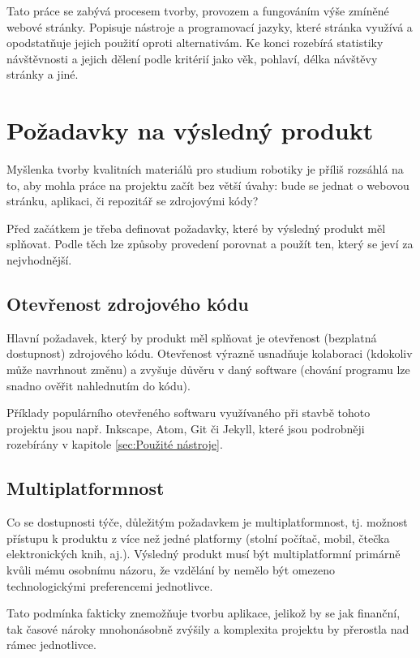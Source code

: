 \documentclass[a4paper, 12pt]{article}
\begin{document}
  Tato práce se zabývá procesem tvorby, provozem a fungováním výše zmíněné webové stránky. Popisuje nástroje a programovací jazyky, které stránka využívá a opodstatňuje jejich použití oproti alternativám. Ke konci rozebírá statistiky návštěvnosti a jejich dělení podle kritérií jako věk, pohlaví, délka návštěvy stránky a jiné.

  \newpage

  \section{Požadavky na výsledný produkt}
  Myšlenka tvorby kvalitních materiálů pro studium robotiky je příliš rozsáhlá na to, aby mohla práce na projektu začít bez větší úvahy: bude se jednat o webovou stránku, aplikaci, či repozitář se zdrojovými kódy?

  Před začátkem je třeba definovat požadavky, které by výsledný produkt měl splňovat. Podle těch lze způsoby provedení porovnat a použít ten, který se jeví za nejvhodnější.


  \subsection{Otevřenost zdrojového kódu}
  Hlavní požadavek, který by produkt měl splňovat je otevřenost (bezplatná dostupnost) zdrojového kódu. Otevřenost výrazně usnadňuje kolaboraci (kdokoliv může navrhnout změnu) a zvyšuje důvěru v daný software (chování programu lze snadno ověřit nahlednutím do kódu).

  Příklady populárního otevřeného softwaru využívaného při stavbě tohoto projektu jsou např. Inkscape, Atom, Git či Jekyll, které jsou podrobněji rozebírány v kapitole \ref{sec:Použité nástroje}.


  \subsection{Multiplatformnost}
  Co se dostupnosti týče, důležitým požadavkem je multiplatformnost, tj. možnost přístupu k produktu z více než jedné platformy (stolní počítač, mobil, čtečka elektronických knih, aj.). Výsledný produkt musí být multiplatformní primárně kvůli mému osobnímu názoru, že vzdělání by nemělo být omezeno technologickými preferencemi jednotlivce.

  Tato podmínka fakticky znemožňuje tvorbu aplikace, jelikož by se jak finanční\cite{apple-store-membership,android-store-membership}, tak časové nároky mnohonásobně zvýšily a komplexita projektu by přerostla nad rámec jednotlivce.
\end{document}
